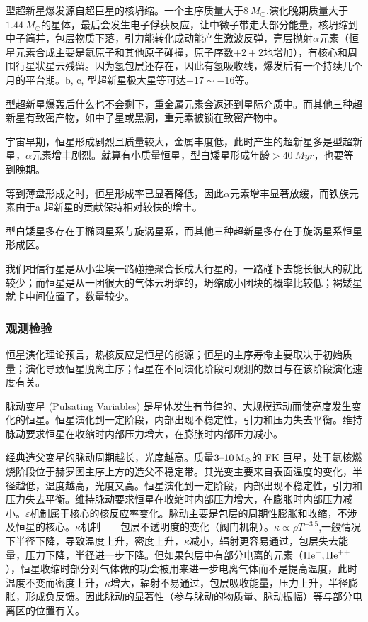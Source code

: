 \documentclass[../天体物理基础.tex]{subfiles}
\begin{document}
\uppercase\expandafter{}型超新星爆发源自超巨星的核坍缩。一个主序质量大于$\qty{8}{M_{\odot}}$,演化晚期质量大于$\qty{1.44}{M_{\odot}}$的星体，最后会发生电子俘获反应，让中微子带走大部分能量，核坍缩到中子简并，包层物质下落，引力能转化成动能产生激波反弹，壳层抛射$\alpha$元素（恒星元素合成主要是氦原子和其他原子碰撞，原子序数$+2+2$地增加），有核心和周围行星状星云残留。因为氢包层还存在，因此有氢吸收线，爆发后有一个持续几个月的平台期。\uppercase\expandafter{}b, \uppercase\expandafter{}c, \uppercase\expandafter{}型超新星极大星等可达$-17\sim-16$等。

\uppercase\expandafter{}型超新星爆轰后什么也不会剩下，重金属元素会返还到星际介质中。而其他三种超新星有致密产物，如中子星或黑洞，重元素被锁在致密产物中。

宇宙早期，恒星形成剧烈且质量较大，金属丰度低，此时产生的超新星多是\uppercase\expandafter{}型超新星，$\alpha$元素增丰剧烈。就算有小质量恒星，\uppercase\expandafter{}型白矮星形成年龄$>\qty{40}{Myr}$，也要等到晚期。

等到薄盘形成之时，恒星形成率已显著降低，因此$\alpha$元素增丰显著放缓，而铁族元素由于\uppercase\expandafter{}a 超新星的贡献保持相对较快的增丰。

\uppercase\expandafter{}型白矮星多存在于椭圆星系与旋涡星系，而其他三种超新星多存在于旋涡星系恒星形成区。

我们相信行星是从小尘埃一路碰撞聚合长成大行星的，一路碰下去能长很大的就比较少；而恒星是从一团很大的气体云坍缩的，坍缩成小团块的概率比较低；褐矮星就卡中间位置了，数量较少。

\subsubsection{观测检验}
恒星演化理论预言，热核反应是恒星的能源；恒星的主序寿命主要取决于初始质量；演化导致恒星脱离主序；恒星在不同演化阶段可观测的数目与在该阶段演化速度有关。

脉动变星 (Pulsating Variables) 是星体发生有节律的、大规模运动而使亮度发生变化的恒星。恒星演化到一定阶段，内部出现不稳定性，引力和压力失去平衡。维持脉动要求恒星在收缩时内部压力增大，在膨胀时内部压力减小。

经典造父变星的脉动周期越长，光度越高。质量$3\text{\textendash}10\,\unit{M_{\odot}}$的 F\text{\textendash}K 巨星，处于氦核燃烧阶段位于赫罗图主序上方的造父不稳定带。其光变主要来自表面温度的变化，半径越低，温度越高，光度又高。恒星演化到一定阶段，内部出现不稳定性，引力和压力失去平衡。维持脉动要求恒星在收缩时内部压力增大，在膨胀时内部压力减小。$\varepsilon$机制属于核心的核反应率变化。脉动主要是包层的周期性膨胀和收缩，不涉及恒星的核心。$\kappa$机制——包层不透明度的变化（阀门机制）。$\kappa\propto{}\rho{}T^{-3.5}$,一般情况下半径下降，导致温度上升，密度上升，$\kappa$减小，辐射更容易通过，包层失去能量，压力下降，半径进一步下降。但如果包层中有部分电离的元素（$\ce{He+},\ce{He++}$），恒星收缩时部分对气体做的功会被用来进一步电离气体而不是提高温度，此时温度不变而密度上升，$\kappa$增大，辐射不易通过，包层吸收能量，压力上升，半径膨胀，形成负反馈。因此脉动的显著性（参与脉动的物质量、脉动振幅）等与部分电离区的位置有关。
\end{document}
